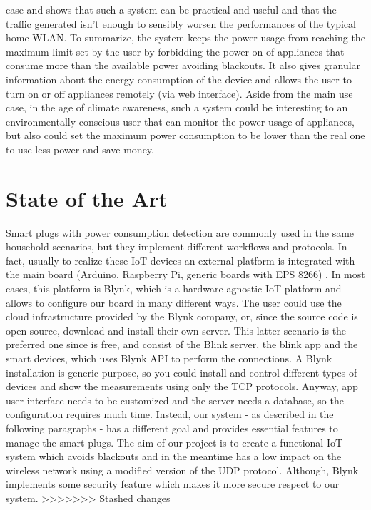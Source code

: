\documentclass[conference]{IEEEtran}
\begin{document}
case and shows that such a system can be practical and useful and that the traffic generated isn't enough to sensibly worsen the performances of the typical home WLAN. To summarize, the system keeps the power usage from reaching the maximum limit set by the user by forbidding the power-on of appliances that consume more than the available power avoiding blackouts. It also gives granular information about the energy consumption of the device and allows the user to turn on or off appliances remotely (via web interface). Aside from the main use case, in the age of climate awareness, such a system could be interesting to an environmentally conscious user that can monitor the power usage of appliances, but also could set the maximum power consumption to be lower than the real one to use less power and save money. 
	\section{State of the Art}
	Smart plugs with power consumption detection are commonly used in the same household scenarios, but they implement different workflows and protocols. In fact, usually to realize these IoT devices an external platform is integrated with the main board (Arduino, Raspberry Pi, generic boards with EPS 8266) . In most cases, this platform is Blynk, which is a hardware-agnostic IoT platform and allows to configure our board in many different ways.
	The user could use the cloud infrastructure provided by the Blynk company, or, since the source code is open-source, download and install their own server. 
	This latter scenario is the preferred one since is free, and consist of the Blink server, the blink app and the smart devices, which uses Blynk API to perform the connections. A Blynk installation is generic-purpose, so you could install and control different types of devices and show the measurements using only the TCP protocols. Anyway, app user interface needs to be customized and the server needs a database, so the configuration requires much time. Instead, our system - as described in the following paragraphs - has a different goal and provides essential features to manage the smart plugs. The aim of our project is to create a functional IoT system which avoids blackouts and in the meantime has a low impact on the wireless network using a modified version of the UDP protocol.
	Although, Blynk implements some security feature which makes it more secure respect to our system.  
>>>>>>> Stashed changes
\end{document}
